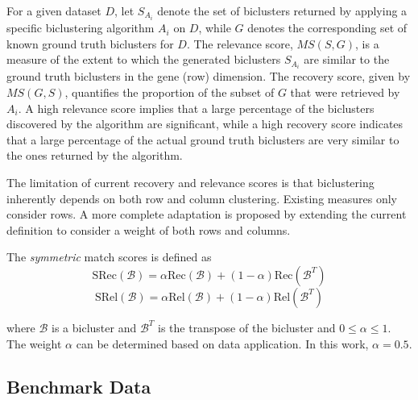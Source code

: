 For a given dataset $D$, let $S_{A_i}$ denote the set of biclusters returned by applying a specific biclustering algorithm $A_i$ on $D$,  while $G$ denotes the corresponding set of known ground truth biclusters for $D$. The relevance score, $MS(S, G)$, is a measure of the extent to which the generated biclusters $S_{A_i}$ are similar to the ground truth biclusters in the gene (row) dimension. The recovery score, given by $MS(G, S)$, quantifies the proportion of the subset of $G$ that were retrieved by $A_i$. A high relevance score implies that a large percentage of the biclusters discovered by the algorithm are significant, while a high recovery score indicates that a large percentage of the actual ground truth biclusters are very similar to the ones returned by the algorithm. 

The limitation of current recovery and relevance scores is that biclustering inherently depends on both row and column clustering. Existing measures only consider rows. A more complete adaptation is proposed by extending the current definition to consider a weight of both rows and columns.

The \emph{symmetric} match scores is defined as
\begin{equation}
    \text{SRec}(\mathcal{B}) = \alpha \text{Rec}(\mathcal{B}) + (1 -\alpha) \text{Rec}(\mathcal{B}^T)
\end{equation}
\begin{equation}
    \text{SRel}(\mathcal{B}) = \alpha \text{Rel}(\mathcal{B}) + (1 -\alpha) \text{Rel}(\mathcal{B}^T)
\end{equation}

\noindent where $\mathcal{B}$ is a bicluster and $\mathcal{B}^T$ is the transpose of the bicluster and $0 \leq \alpha \leq 1$. The weight $\alpha$ can be determined based on data application. In this work, $\alpha = 0.5$. 

\subsection{Benchmark Data}
\label{sec:syndata-review}

